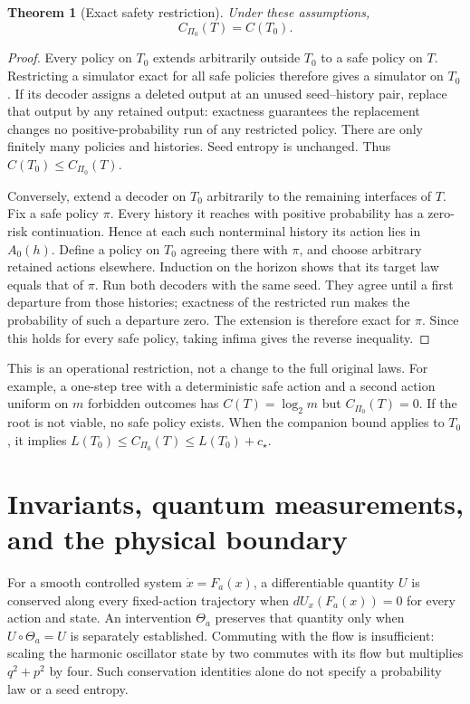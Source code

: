 \documentclass[11pt]{article}
\newtheorem{theorem}{Theorem}[section]
\theoremstyle{remark}\newtheorem{remark}[theorem]{Remark}
\newcommand{\cstar}{c_\star}
\begin{document}
\begin{theorem}[Exact safety restriction]
Under these assumptions,
\[
 \boxed{C_{\Pi_0}(T)=C(T_0).}
\]
\end{theorem}
\begin{proof}
Every policy on $T_0$ extends arbitrarily outside $T_0$ to a safe policy on $T$.
Restricting a simulator exact for all safe policies therefore gives a simulator
on $T_0$. If its decoder assigns a deleted output at an unused seed--history
pair, replace that output by any retained output: exactness guarantees the
replacement changes no positive-probability run of any restricted policy.
There are only finitely many policies and histories. Seed entropy is unchanged.
Thus $C(T_0)\le C_{\Pi_0}(T)$.

Conversely, extend a decoder on $T_0$ arbitrarily to the remaining interfaces of
$T$. Fix a safe policy $\pi$. Every history it reaches with positive probability
has a zero-risk continuation. Hence at each such nonterminal history its action
lies in $A_0(h)$. Define a policy on $T_0$ agreeing there with $\pi$, and choose
arbitrary retained actions elsewhere. Induction on the horizon shows that its
target law equals that of $\pi$. Run both decoders with the same seed. They
agree until a first departure from those histories; exactness of the restricted
run makes the probability of such a departure zero. The extension is therefore
exact for $\pi$. Since this holds for every safe policy, taking infima gives
the reverse inequality.
\end{proof}
This is an operational restriction, not a change to the full original laws.
For example, a one-step tree with a deterministic safe action and a second
action uniform on $m$ forbidden outcomes has $C(T)=\log_2m$ but
$C_{\Pi_0}(T)=0$. If the root is not viable, no safe policy exists.
When the companion bound applies to $T_0$, it implies
$L(T_0)\le C_{\Pi_0}(T)\le L(T_0)+\cstar$.

\section{Invariants, quantum measurements, and the physical boundary}
For a smooth controlled system $\dot x=F_a(x)$, a differentiable quantity $U$
is conserved along every fixed-action trajectory when
$dU_x(F_a(x))=0$ for every action and state. An intervention $\Theta_a$
preserves that quantity only when $U\circ\Theta_a=U$ is separately established.
Commuting with the flow is insufficient: scaling the harmonic oscillator state
by two commutes with its flow but multiplies $q^2+p^2$ by four. Such conservation
identities alone do not specify a probability law or a seed entropy.
\end{document}
